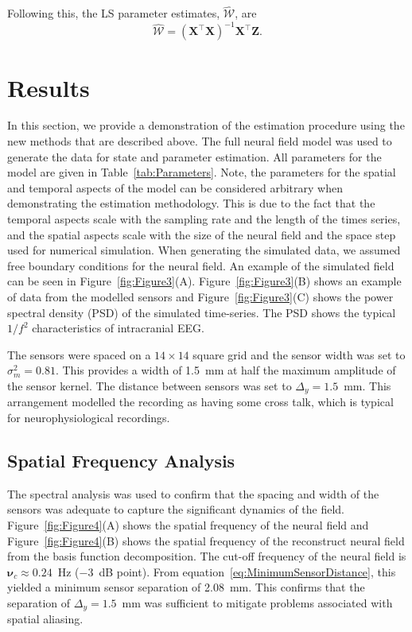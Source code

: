 \documentclass[12pt]{iopart}
\begin{document}
Following this, the LS parameter estimates, $ \mathcal{\hat{W}}$, are
\begin{equation}
	\mathcal{\hat{W}}=(\mathbf X^\top\mathbf X)^{-1}\mathbf X^\top\mathbf Z. 
\end{equation}

\section{Results}\label{ResultsSection} In this section, we provide a demonstration of the estimation procedure using the new methods that are described above. The full neural field model was used to generate the data for state and parameter estimation. All parameters for the model are given in Table~\ref{tab:Parameters}. Note, the parameters for the spatial and temporal aspects of the model can be considered arbitrary when demonstrating the estimation methodology. This is due to the fact that the temporal aspects scale with the sampling rate and the length of the times series, and the spatial aspects scale with the size of the neural field and the space step used for numerical simulation. When generating the simulated data, we assumed free boundary conditions for the neural field. An example of the simulated field can be seen in Figure~\ref{fig:Figure3}(A). Figure~\ref{fig:Figure3}(B) shows an example of data from the modelled sensors and Figure~\ref{fig:Figure3}(C) shows the power spectral density (PSD) of the simulated time-series. The PSD shows the typical $1/f^2$ characteristics of intracranial EEG.

The sensors were spaced on a $14 \times 14$ square grid and the sensor width was set to $\sigma^2_m = 0.81$. This provides a width of 1.5~mm at half the maximum amplitude of the sensor kernel. The distance between sensors was set to $\Delta_y = 1.5$~mm. This arrangement modelled the recording as having some cross talk, which is typical for neurophysiological recordings.

\subsection{Spatial Frequency Analysis} 
The spectral analysis was used to confirm that the spacing and width of the sensors was adequate to capture the significant dynamics of the field. Figure~\ref{fig:Figure4}(A) shows the spatial frequency of the neural field and Figure~\ref{fig:Figure4}(B) shows the spatial frequency of the reconstruct neural field from the basis function decomposition. The cut-off frequency of the neural field is $\boldsymbol{\nu}_c \approx 0.24$~Hz ($-3$~dB point). From equation~\ref{eq:MinimumSensorDistance}, this yielded a minimum sensor separation of 2.08~mm. This confirms that the separation of $\Delta_{y} = 1.5$~mm was sufficient to mitigate problems associated with spatial aliasing.
\end{document}
